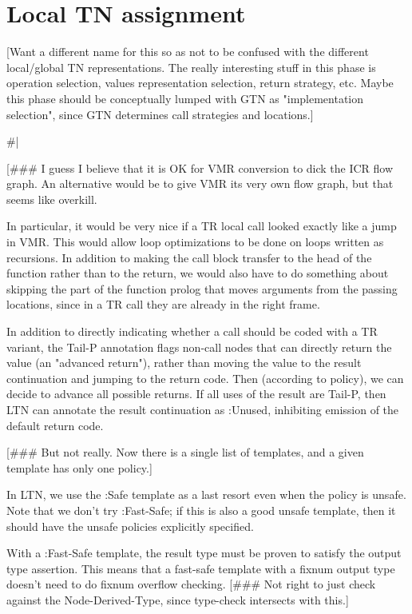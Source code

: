
\chapter{Local TN assignment}

[Want a different name for this so as not to be confused with the different
local/global TN representations.  The really interesting stuff in this phase is
operation selection, values representation selection, return strategy, etc.
Maybe this phase should be conceptually lumped with GTN as "implementation
selection", since GTN determines call strategies and locations.]

\#|

[\#\#\# I guess I believe that it is OK for VMR conversion to dick the ICR flow
graph.  An alternative would be to give VMR its very own flow graph, but that
seems like overkill.

In particular, it would be very nice if a TR local call looked exactly like a
jump in VMR.  This would allow loop optimizations to be done on loops written
as recursions.  In addition to making the call block transfer to the head of
the function rather than to the return, we would also have to do something
about skipping the part of the function prolog that moves arguments from the
passing locations, since in a TR call they are already in the right frame.


In addition to directly indicating whether a call should be coded with a TR
variant, the Tail-P annotation flags non-call nodes that can directly return
the value (an "advanced return"), rather than moving the value to the result
continuation and jumping to the return code.  Then (according to policy), we
can decide to advance all possible returns.  If all uses of the result are
Tail-P, then LTN can annotate the result continuation as :Unused, inhibiting
emission of the default return code.

[\#\#\# But not really.  Now there is a single list of templates, and a given
template has only one policy.]

In LTN, we use the :Safe template as a last resort even when the policy is
unsafe.  Note that we don't try :Fast-Safe; if this is also a good unsafe
template, then it should have the unsafe policies explicitly specified.

With a :Fast-Safe template, the result type must be proven to satisfy the
output type assertion.  This means that a fast-safe template with a fixnum
output type doesn't need to do fixnum overflow checking.  [\#\#\# Not right to
just check against the Node-Derived-Type, since type-check intersects with
this.]

